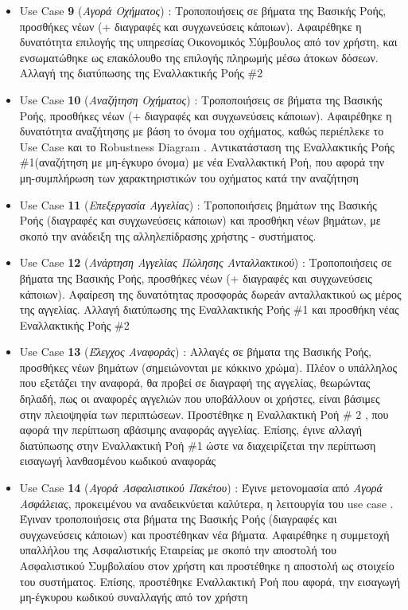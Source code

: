 \documentclass{../ol-softwaremanual}
\begin{document}
\begin{itemize}
		\item \en Use Case \textbf{9} \gr (\textit{Αγορά Οχήματος}) : Τροποποιήσεις σε βήματα της Βασικής Ροής, προσθήκες νέων (+ διαγραφές και συγχωνεύσεις κάποιων). Αφαιρέθηκε η δυνατότητα επιλογής της υπηρεσίας Οικονομικός Σύμβουλος από τον χρήστη, και ενσωματώθηκε ως επακόλουθο της επιλογής πληρωμής μέσω άτοκων δόσεων. Αλλαγή της διατύπωσης της Εναλλακτικής Ροής \en \#2\gr
		
		\item \en Use Case \textbf{10} \gr (\textit{Αναζήτηση Οχήματος}) : Τροποποιήσεις σε βήματα της Βασικής Ροής, προσθήκες νέων (+ διαγραφές και συγχωνεύσεις κάποιων). Αφαιρέθηκε η δυνατότητα αναζήτησης με βάση  το όνομα του οχήματος, καθώς περιέπλεκε το \en Use Case \gr και το \en Robustness Diagram \gr. Αντικατάσταση της Εναλλακτικής Ροής \en \#1\gr (αναζήτηση με μη-έγκυρο όνομα) με νέα Εναλλακτική Ροή, που αφορά την μη-συμπλήρωση των χαρακτηριστικών του οχήματος κατά την αναζήτηση
		
		\item \en Use Case \textbf{11} \gr (\textit{Επεξεργασία Αγγελίας}) : Τροποποιήσεις βημάτων της Βασικής Ροής (διαγραφές και συγχωνεύσεις κάποιων) και προσθήκη νέων βημάτων, με σκοπό την ανάδειξη της αλληλεπίδρασης χρήστης - συστήματος.

		\item \en Use Case \textbf{12} \gr (\textit{Ανάρτηση Αγγελίας Πώλησης Ανταλλακτικού}) : Τροποποιήσεις σε βήματα της Βασικής Ροής, προσθήκες νέων (+ διαγραφές και συγχωνεύσεις κάποιων). Αφαίρεση της δυνατότητας προσφοράς δωρεάν ανταλλακτικού ως μέρος της αγγελίας. Αλλαγή διατύπωσης της Εναλλακτικής Ροής \en \#1 \gr και προσθήκη νέας Εναλλακτικής Ροής \en \#2\gr 
		
		\item \en Use Case \textbf{13} \gr (\textit{Έλεγχος Αναφοράς}) : Αλλαγές σε βήματα της Βασικής Ροής, προσθήκες νέων βημάτων (σημειώνονται με κόκκινο χρώμα). Πλέον ο υπάλληλος που εξετάζει την αναφορά, θα προβεί σε διαγραφή της αγγελίας, θεωρώντας δηλαδή, πως οι αναφορές αγγελιών που υποβάλλουν οι χρήστες, είναι βάσιμες στην πλειοψηφία των περιπτώσεων. Προστέθηκε η Εναλλακτική Ροή \en \# 2 \gr, που αφορά την περίπτωση αβάσιμης αναφοράς αγγελίας. Επίσης, έγινε αλλαγή διατύπωσης στην Εναλλακτική Ροή \en \#1 \gr ώστε να διαχειρίζεται την περίπτωση εισαγωγή λανθασμένου κωδικού αναφοράς
		
		\item \en Use Case \textbf{14} \gr (\textit{Αγορά Ασφαλιστικού Πακέτου}) : Έγινε μετονομασία από \textit{Αγορά Ασφάλειας}, προκειμένου να αναδεικνύεται καλύτερα, η λειτουργία του \en use case \gr. Έγιναν τροποποιήσεις στα βήματα της Βασικής Ροής (διαγραφές και συγχωνεύσεις κάποιων) και προστέθηκαν νέα βήματα. Αφαιρέθηκε η συμμετοχή υπαλλήλου της Ασφαλιστικής Εταιρείας με σκοπό την αποστολή του Ασφαλιστικού Συμβολαίου στον χρήστη και προστέθηκε η αποστολή ως στοιχείο του συστήματος. Επίσης, προστέθηκε Εναλλακτική Ροή που αφορά, την εισαγωγή μη-έγκυρου κωδικού συναλλαγής από τον χρήστη
		

\end{itemize}
\end{document}
